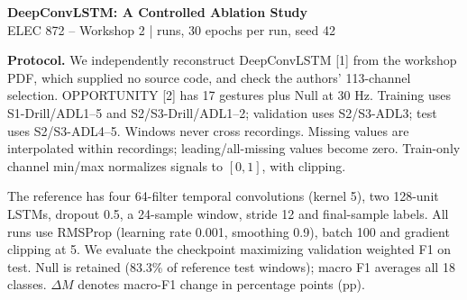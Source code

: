 \documentclass[10pt,a4paper]{article}
\begin{document}
\begin{center}
{\Large\bfseries DeepConvLSTM: A Controlled Ablation Study}\\[3pt]
{\small ELEC 872 -- Workshop 2 \quad |  runs, 30 epochs per run, seed 42}
\end{center}
\vspace{-5pt}
\textbf{Protocol.}
We independently reconstruct DeepConvLSTM [1] from the workshop PDF, which supplied no source code, and check the authors' 113-channel selection. OPPORTUNITY [2] has 17 gestures plus Null at 30 Hz. Training uses S1-Drill/ADL1--5 and S2/S3-Drill/ADL1--2; validation uses S2/S3-ADL3; test uses S2/S3-ADL4--5. Windows never cross recordings. Missing values are interpolated within recordings; leading/all-missing values become zero. Train-only channel min/max normalizes signals to $[0,1]$, with clipping.

The reference has four 64-filter temporal convolutions (kernel 5), two 128-unit LSTMs, dropout 0.5, a 24-sample window, stride 12 and final-sample labels. All runs use RMSProp (learning rate 0.001, smoothing 0.9), batch 100 and gradient clipping at 5. We evaluate the checkpoint maximizing validation weighted F1 on test. Null is retained (83.3\% of reference test windows); macro F1 averages all 18 classes. $\Delta M$ denotes macro-F1 change in percentage points (pp).
\end{document}
